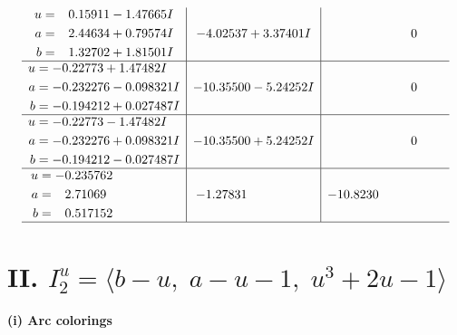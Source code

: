 \documentclass[1p]{elsarticle_modified}
\theoremstyle{definition}
\begin{document}
$$\begin{array}{c|c|c}
\begin{aligned}
u &= \phantom{-}0.15911 - 1.47665 I \\
a &= \phantom{-}2.44634 + 0.79574 I \\
b &= \phantom{-}1.32702 + 1.81501 I\end{aligned}
 & -4.02537 + 3.37401 I & \phantom{-0.000000 } 0 \\ \hline\begin{aligned}
u &= -0.22773 + 1.47482 I \\
a &= -0.232276 - 0.098321 I \\
b &= -0.194212 + 0.027487 I\end{aligned}
 & -10.35500 - 5.24252 I & \phantom{-0.000000 } 0 \\ \hline\begin{aligned}
u &= -0.22773 - 1.47482 I \\
a &= -0.232276 + 0.098321 I \\
b &= -0.194212 - 0.027487 I\end{aligned}
 & -10.35500 + 5.24252 I & \phantom{-0.000000 } 0 \\ \hline\begin{aligned}
u &= -0.235762\phantom{ +0.000000I} \\
a &= \phantom{-}2.71069\phantom{ +0.000000I} \\
b &= \phantom{-}0.517152\phantom{ +0.000000I}\end{aligned}
 & -1.27831\phantom{ +0.000000I} & -10.8230\phantom{ +0.000000I}\\
 \hline 
 \end{array}$$\newpage\newpage\renewcommand{\arraystretch}{1}
\centering \section*{II. $I^u_{2}= \langle b- u,\;a- u-1,\;u^3+2 u-1 \rangle$}
\flushleft \textbf{(i) Arc colorings}\\
\end{document}
